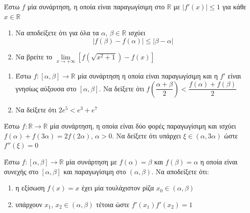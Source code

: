 \documentclass{presentation}
\begin{document}
\begin{askisi}
  Έστω $f$ μία συνάρτηση, η οποία είναι παραγωγίσιμη στο $\mathbb{R}$ με $|f'(x)|\le 1$ για κάθε $x\in\mathbb{R}$
  \begin{enumerate}
    \item<1-> Να αποδείξετε ότι για όλα τα $α$, $β\in\mathbb{R}$ ισχύει
          $$|f(β)-f(α)|\le |β-α|$$
    \item<2-> Να βρείτε το $\lim\limits_{x \to +\infty}{ \left[  f\left( \sqrt{x^2+1} \right)-f(x)  \right]}$
  \end{enumerate}
\end{askisi}

\begin{askisi}
  \begin{enumerate}
    \item<1-> Έστω $f:[α,β]\to\mathbb{R}$ μία συνάρτηση η οποία είναι παραγωγίσιμη και η $f'$ είναι γνησίως αύξουσα στο $[α,β]$. Να δείξετε ότι $f\left( \dfrac{α+β}{2} \right)<\dfrac{f(α)+f(β)}{2} $
    \item<2-> Να δείξετε ότι $2e^5<e^3+e^7$
  \end{enumerate}

\end{askisi}

\begin{askisi}
  Έστω $f:\mathbb{R}\to\mathbb{R}$ μία συνάρτηση, η οποία είναι δύο φορές παραγωγίσιμη και ισχύει $f(α)+f(3α)=2f(2α)$, $α>0$. Να δείξετε ότι υπάρχει $ξ\in (α,3α)$ ώστε $f''(ξ)=0$

\end{askisi}

\begin{askisi}
  Έστω $f:[α,β]\to\mathbb{R}$ μία συνάρτηση με $f(α)=β$ και $f(β)=α$ η οποία είναι συνεχής στο $[α,β]$ και παραγωγίσιμη στο $(α,β)$. Να αποδείξετε ότι:
  \begin{enumerate}
    \item<1-> η εξίσωση $f(x)=x$ έχει μία τουλάχιστον ρίζα $x_0\in (α,β)$
    \item<2-> υπάρχουν $x_1$, $x_2\in (α,β)$ τέτοια ώστε $f'(x_1)f'(x_2)=1$
  \end{enumerate}

\end{askisi}

\moodle
\end{document}
